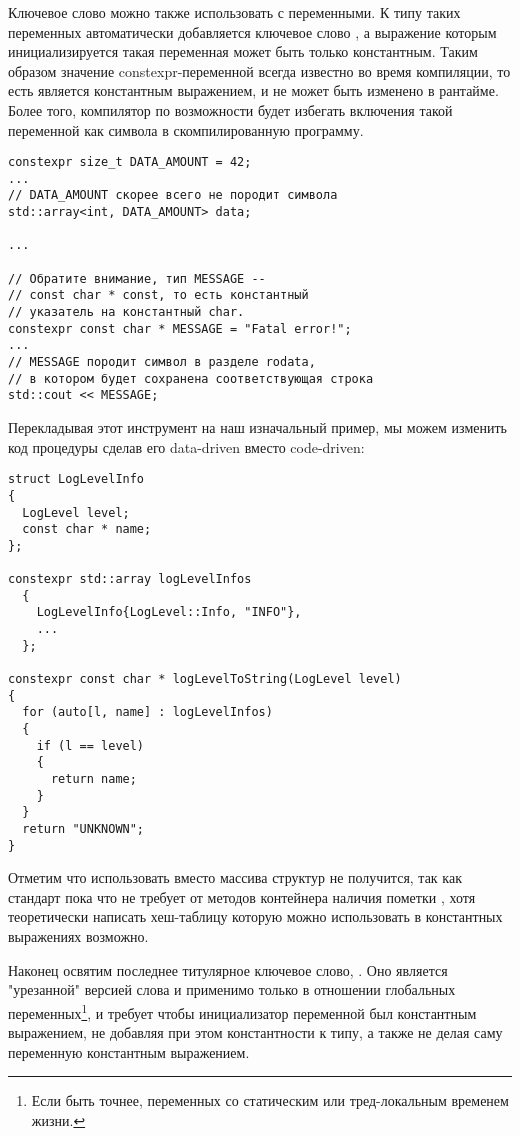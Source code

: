 Ключевое слово  можно также использовать с переменными.
К типу таких переменных автоматически добавляется ключевое слово , а выражение которым инициализируется такая переменная может быть только константным.
Таким образом значение constexpr-переменной всегда известно во время компиляции, то есть является константным выражением, и не может быть изменено в рантайме.
Более того, компилятор по возможности будет избегать включения такой переменной как символа в скомпилированную программу.
\begin{verbatim}
constexpr size_t DATA_AMOUNT = 42;
...
// DATA_AMOUNT скорее всего не породит символа
std::array<int, DATA_AMOUNT> data;

...

// Обратите внимание, тип MESSAGE --
// const char * const, то есть константный
// указатель на константный char.
constexpr const char * MESSAGE = "Fatal error!";
...
// MESSAGE породит символ в разделе rodata,
// в котором будет сохранена соответствующая строка
std::cout << MESSAGE;
\end{verbatim}
Перекладывая этот инструмент на наш изначальный пример, мы можем изменить код процедуры  сделав его data-driven вместо code-driven:
\begin{verbatim}
struct LogLevelInfo
{
  LogLevel level;
  const char * name;
};

constexpr std::array logLevelInfos
  {
    LogLevelInfo{LogLevel::Info, "INFO"},
    ...
  };

constexpr const char * logLevelToString(LogLevel level)
{
  for (auto[l, name] : logLevelInfos)
  {
    if (l == level)
    {
      return name;
    }
  }
  return "UNKNOWN";
}
\end{verbatim}
Отметим что использовать  вместо массива структур не получится, так как стандарт пока что не требует от методов контейнера  наличия пометки , хотя теоретически написать хеш-таблицу которую можно использовать в константных выражениях возможно.

Наконец освятим последнее титулярное ключевое слово, .
Оно является "урезанной" версией слова  и применимо только в отношении глобальных переменных\footnote{Если быть точнее, переменных со статическим или тред-локальным временем жизни.}, и требует чтобы инициализатор переменной был константным выражением, не добавляя при этом константности к типу, а также не делая саму переменную константным выражением.

